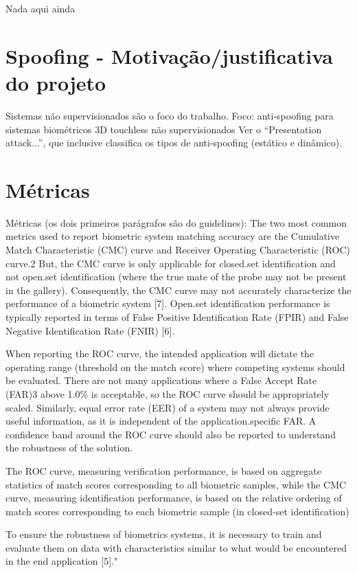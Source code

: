 Nada aqui ainda

\section{Spoofing - Motivação/justificativa do projeto} \label{spoofing}
Sistemas não supervisionados são o foco do trabalho.
Foco: anti-spoofing para sistemas biométricos 3D touchless não supervisionados
Ver o ``Presentation attack...'', que inclusive classifica os tipos de anti-spoofing (estático e dinâmico).

\section{Métricas}
Métricas (os dois primeiros parágrafos são do guidelines):
The two most common metrics used to report biometric system matching accuracy are the Cumulative Match Characteristic (CMC) curve and Receiver Operating Characteristic (ROC) curve.2 But, the CMC curve is only applicable for closed.set identification and not open.set identification (where the true mate of the probe may not be present in the gallery). Consequently, the CMC curve may not accurately characterize the performance of a biometric system [7]. Open.set identification performance is typically reported in terms of False Positive Identification Rate (FPIR) and False Negative Identification Rate (FNIR) [6].

When reporting the ROC curve, the intended application will dictate the operating range (threshold on the match score) where competing systems should be evaluated. There are not many applications where a False Accept Rate (FAR)3 above 1.0\% is acceptable, so the ROC curve should be appropriately scaled. Similarly, equal error rate (EER) of a system may not always provide useful information, as it is independent of the application.specific FAR. A confidence band around the ROC curve should also be reported to understand the robustness of the solution.

The ROC curve, measuring verification performance, is based
on aggregate statistics of match scores corresponding to
all biometric samples, while the CMC curve, measuring
identification performance, is based on the relative ordering
of match scores corresponding to each biometric sample
(in closed-set identification)

To ensure the robustness of biometrics systems, it is necessary to train and evaluate them on data with characteristics similar to what would be encountered in the end application [5]."